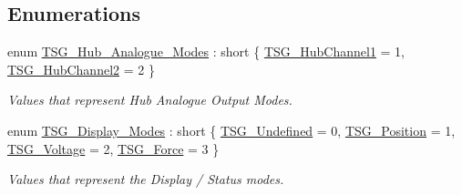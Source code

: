 \subsection*{Enumerations}
\begin{DoxyCompactItemize}
\item 
enum \hyperlink{group___t_cube_strain_gauge_gad7e362e035ed669480ad23ba35b3a489}{T\+S\+G\+\_\+\+Hub\+\_\+\+Analogue\+\_\+\+Modes} \+: short \{ \hyperlink{group___t_cube_strain_gauge_ggad7e362e035ed669480ad23ba35b3a489a4fd26262f5ec73b48072682aaa4ced4b}{T\+S\+G\+\_\+\+Hub\+Channel1} = 1, 
\hyperlink{group___t_cube_strain_gauge_ggad7e362e035ed669480ad23ba35b3a489aaf95831175e1e36bba0ab0ba3895ec4b}{T\+S\+G\+\_\+\+Hub\+Channel2} = 2
 \}\begin{DoxyCompactList}\small\item\em Values that represent Hub Analogue Output Modes. \end{DoxyCompactList}
\item 
enum \hyperlink{group___t_cube_strain_gauge_ga73258438eff8b547e6f73771e6c9687f}{T\+S\+G\+\_\+\+Display\+\_\+\+Modes} \+: short \{ \hyperlink{group___t_cube_strain_gauge_gga73258438eff8b547e6f73771e6c9687faa39e9b4383391909f483d4f9ff8a3800}{T\+S\+G\+\_\+\+Undefined} = 0, 
\hyperlink{group___t_cube_strain_gauge_gga73258438eff8b547e6f73771e6c9687fa1d49c8965d1fa1d3113d227adcb67666}{T\+S\+G\+\_\+\+Position} = 1, 
\hyperlink{group___t_cube_strain_gauge_gga73258438eff8b547e6f73771e6c9687faed95b357cdff60d3d1d026d9b439b1e8}{T\+S\+G\+\_\+\+Voltage} = 2, 
\hyperlink{group___t_cube_strain_gauge_gga73258438eff8b547e6f73771e6c9687fa95b138d9d7759c9ba82385bb18d1ef8c}{T\+S\+G\+\_\+\+Force} = 3
 \}\begin{DoxyCompactList}\small\item\em Values that represent the Display / Status modes. \end{DoxyCompactList}
\end{DoxyCompactItemize}
